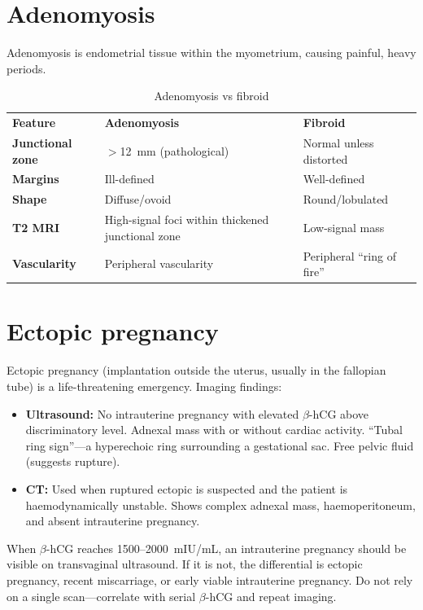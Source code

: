 \section{Adenomyosis}
Adenomyosis is endometrial tissue within the myometrium, causing painful, heavy periods.

\begin{table}[h]
\centering
\caption{Adenomyosis vs fibroid}
\label{tab:adeno_vs_fibroid}
\begin{tabular}{@{}p{}p{}p{}@{}}
\hline
\textbf{Feature} & \textbf{Adenomyosis} & \textbf{Fibroid} \\
\textbf{Junctional zone} & $>$12~mm (pathological) & Normal unless distorted \\
\textbf{Margins} & Ill-defined & Well-defined \\
\textbf{Shape} & Diffuse/ovoid & Round/lobulated \\
\textbf{T2 MRI} & High-signal foci within thickened junctional zone & Low-signal mass \\
\textbf{Vascularity} & Peripheral vascularity & Peripheral ``ring of fire'' \\
\hline
\end{tabular}
\end{table}

\section{Ectopic pregnancy}
Ectopic pregnancy (implantation outside the uterus, usually in the fallopian tube) is a life-threatening emergency. Imaging findings:

\begin{itemize}
    \item \textbf{Ultrasound:} No intrauterine pregnancy with elevated $\beta$-hCG above discriminatory level. Adnexal mass with or without cardiac activity. ``Tubal ring sign''---a hyperechoic ring surrounding a gestational sac. Free pelvic fluid (suggests rupture).
    \item \textbf{CT:} Used when ruptured ectopic is suspected and the patient is haemodynamically unstable. Shows complex adnexal mass, haemoperitoneum, and absent intrauterine pregnancy.
\end{itemize}

\begin{pearlbox}
When $\beta$-hCG reaches 1500--2000~mIU/mL, an intrauterine pregnancy should be visible on transvaginal ultrasound. If it is not, the differential is ectopic pregnancy, recent miscarriage, or early viable intrauterine pregnancy. Do not rely on a single scan---correlate with serial $\beta$-hCG and repeat imaging.
\end{pearlbox}

